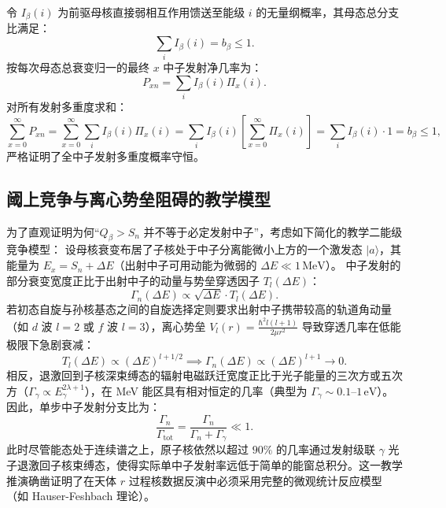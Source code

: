 令 $I_\beta(i)$ 为前驱母核直接弱相互作用馈送至能级 $i$ 的无量纲概率，其母态总分支比满足：
\begin{equation}\label{eq:appD-ibeta-sum}
\sum_{i} I_\beta(i) = b_\beta \le 1.
\end{equation}
按每次母态总衰变归一的最终 $x$ 中子发射净几率为：
\begin{equation}\label{eq:appD-pxn-total-prob}
P_{xn} = \sum_{i} I_\beta(i) \Pi_x(i).
\end{equation}
对所有发射多重度求和：
\begin{equation}\label{eq:appD-pxn-sum-proof}
\sum_{x=0}^\infty P_{xn} = \sum_{x=0}^\infty \sum_i I_\beta(i) \Pi_x(i) = \sum_i I_\beta(i) \left[ \sum_{x=0}^\infty \Pi_x(i) \right] = \sum_i I_\beta(i) \cdot 1 = b_\beta \le 1,
\end{equation}
严格证明了全中子发射多重度概率守恒。

\subsection{阈上竞争与离心势垒阻碍的教学模型}

为了直观证明为何“$Q_\beta > S_n$ 并不等于必定发射中子”，考虑如下简化的教学二能级竞争模型：
设母核衰变布居了子核处于中子分离能微小上方的一个激发态 $|a\rangle$，其能量为 $E_x = S_n + \Delta E$（出射中子可用动能为微弱的 $\Delta E \ll 1\,\text{MeV}$）。
中子发射的部分衰变宽度正比于出射中子的动量与势垒穿透因子 $T_l(\Delta E)$：
\begin{equation}\label{eq:appD-neutron-width-scaling}
\Gamma_n(\Delta E) \propto \sqrt{\Delta E} \cdot T_l(\Delta E).
\end{equation}
若初态自旋与孙核基态之间的自旋选择定则要求出射中子携带较高的轨道角动量（如 $d$ 波 $l=2$ 或 $f$ 波 $l=3$），离心势垒 $V_l(r) = \frac{\hbar^2 l(l+1)}{2\mu r^2}$ 导致穿透几率在低能极限下急剧衰减：
\begin{equation}\label{eq:appD-centrifugal-suppression}
T_l(\Delta E) \propto (\Delta E)^{l + 1/2} \implies \Gamma_n(\Delta E) \propto (\Delta E)^{l + 1} \to 0.
\end{equation}
相反，退激回到子核深束缚态的辐射电磁跃迁宽度正比于光子能量的三次方或五次方（$\Gamma_\gamma \propto E_\gamma^{2\lambda + 1}$），在 MeV 能区具有相对恒定的几率（典型为 $\Gamma_\gamma \sim 0.1$–$1\,\text{eV}$）。
因此，单步中子发射分支比为：
\begin{equation}\label{eq:appD-branch-competition}
\frac{\Gamma_n}{\Gamma_{\mathrm{tot}}} = \frac{\Gamma_n}{\Gamma_n + \Gamma_\gamma} \ll 1.
\end{equation}
此时尽管能态处于连续谱之上，原子核依然以超过 $90\%$ 的几率通过发射级联 $\gamma$ 光子退激回子核束缚态，使得实际单中子发射率远低于简单的能窗总积分。这一教学推演确凿证明了在天体 $r$ 过程核数据反演中必须采用完整的微观统计反应模型（如 Hauser-Feshbach 理论）。

